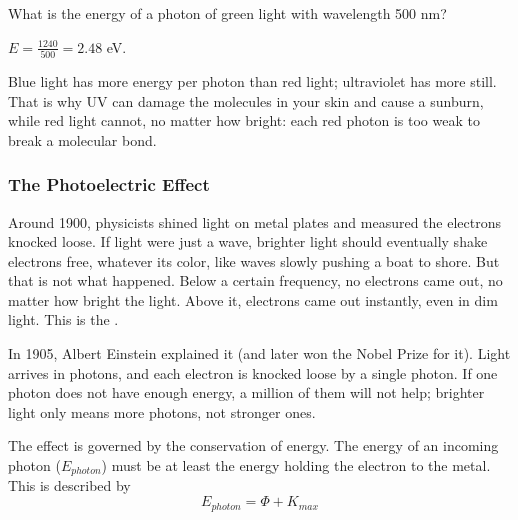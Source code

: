 \begin{Worked}
\begin{Problem}
What is the energy of a photon of green light with
wavelength 500 nm?
\end{Problem}
\begin{Solution}
$E = \frac{1240}{500} = 2.48$ eV.
\end{Solution}
\end{Worked}

Blue light has more energy per photon than red light; ultraviolet has more
still. That is why UV can damage the molecules in your skin and cause a
sunburn, while red light cannot, no matter how bright: each red photon is
too weak to break a molecular bond.

\subsubsection{The Photoelectric Effect}

Around 1900, physicists shined light on metal plates and measured the
electrons knocked loose. If light were just a wave, brighter light should
eventually shake electrons free, whatever its color, like waves slowly
pushing a boat to shore. But that is not what happened. Below a certain
frequency, no electrons came out, no matter how bright the light. Above
it, electrons came out instantly, even in dim light. This is the
.

In 1905, Albert Einstein explained it (and later won the Nobel Prize for
it). Light arrives in photons, and each electron is knocked loose by a
single photon. If one photon does not have enough energy, a million of them
will not help; brighter light only means more photons, not stronger ones.

The effect is governed by the conservation of energy. The energy of an
incoming photon ($E_{photon}$) must be at least the energy holding the
electron to the metal. This is described by $$E_{photon} = \Phi + K_{max}$$

